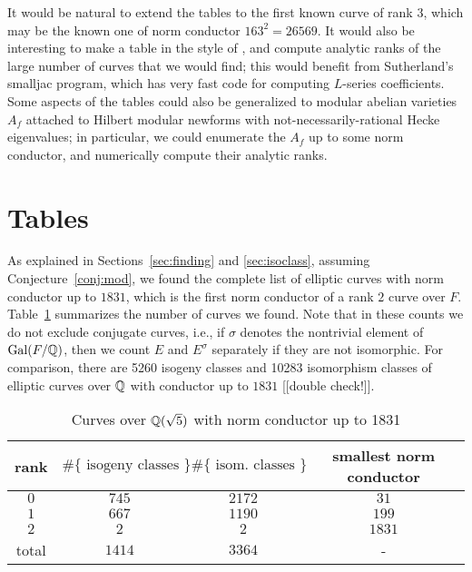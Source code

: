 \documentclass{amsart}
\begin{document}
It would be natural to extend the tables to the first known curve of
rank $3$, which may be the known one of norm conductor $163^2=26569$.
It would also be interesting to make a table in the style of
\cite{stein-watkins:ants5}, and compute analytic ranks of the large
number of curves that we would find; this would benefit from
Sutherland's smalljac program, which has very fast code for computing
$L$-series coefficients.  Some aspects of the tables could also be
generalized to modular abelian varieties $A_f$ attached to Hilbert
modular newforms with not-necessarily-rational Hecke eigenvalues; in
particular, we could enumerate the $A_f$ up to some norm conductor,
and numerically compute their analytic ranks.

\section{Tables}\label{sec:tables}

As explained in Sections~\ref{sec:finding} and \ref{sec:isoclass},
assuming Conjecture~\ref{conj:mod}, we found the complete list of
elliptic curves with norm conductor up to $1831$, which is the first
norm conductor of a rank $2$ curve over $F$.  Table~\ref{table:counts}
summarizes the number of curves we found.  Note that in these counts
we do not exclude conjugate curves, i.e., if $\sigma$ denotes the
nontrivial element of $\operatorname{Gal}(F/\mathbb{Q})$, then we count $E$ and $E^{\sigma}$
separately if they are not isomorphic.  For comparison, 
there are 5260 isogeny classes and 10283 isomorphism classes
of elliptic curves over $\mathbb{Q}$ with conductor up to $1831$ [[double check!]].
\begin{center}
\begin{table}[h]
\caption{Curves over $\mathbb{Q}(\sqrt{5})$ with norm conductor up to 1831\label{table:counts}}
\begin{tabular}{|c|c|c|c|}\hline
rank & $\#\{\text{ isogeny classes }\}$ &  $\#\{\text{ isom. classes }\}$ & smallest norm conductor \\\hline
 $0$  & $745$  & $2172$ & $31$\\\hline
 $1$  & $667$  & $1190$ & $199$ \\\hline
 $2$  & $2$    & $2$    & $1831$ \\\hline
total & $1414$ & $3364$ & - \\\hline
\end{tabular}
\end{table}
\end{center}
\end{document}
